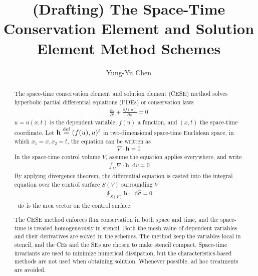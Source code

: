 \documentclass[11pt,dvips]{article}
\title{
%
(Drafting) The Space-Time Conservation Element and Solution Element Method
Schemes
%
}
\author{
%
Yung-Yu Chen
%
}
\numberwithin{equation}{section}
\newcommand{\defeq}{\ensuremath{\buildrel {\text{def}}\over{=}}}
\newcommand{\dif}{\mathop{}\!\mathrm{d}}
\begin{document}
\maketitle

\begin{abstract}

The space-time conservation element and solution element (CESE) method solves
hyperbolic partial differential equations (PDEs) or conservation
laws \citep{lax_hyperbolic_1973}
\begin{align*}
  \frac{\partial u}{\partial t} + \frac{\partial f(u)}{\partial x} = 0
\end{align*}
$u = u(x, t)$ is the dependent variable, $f(u)$ a function, and $(x, t)$ the
space-time coordinate.  Let $\mathbf{h} \defeq (f(u),u)^t$ in two-dimensional
space-time Euclidean space, in which $x_1=x, x_2=t$, the equation can be
written as
\begin{align*}
  \nabla\cdot\mathbf{h} = 0
\end{align*}
In the space-time control volume $V$, assume the equation applies everywhere,
and write
\begin{align*}
  \int_V\nabla\cdot\mathbf{h}\dif v = 0
\end{align*}
By applying divergence theorem, the differential equation is casted into the
integral equation over the control surface $S(V)$ surrounding $V$
\begin{align*}
  \oint_{S(V)}\mathbf{h}\cdot\dif\hat{\sigma} = 0
\end{align*}
$\dif\hat{\sigma}$ is the area vector on the control surface.

The CESE method enforces flux conservation in both space and time, and the
space-time is treated homogeneously in stencil.  Both the mesh value of
dependent variables and their derivatives are solved in the schemes.  The
method keep the variables local in stencil, and the CEs and the SEs are chosen
to make stencil compact.  Space-time invariants are used to minimize numerical
dissipation, but the characteristics-based methods are not used when obtaining
solution.  Whenever possible, ad hoc treatments are avoided.
\citep{chang_method_1995}


\end{abstract}
\end{document}

